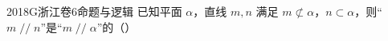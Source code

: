 
\begin{problem}{2018}{G}{浙江卷}{6}{命题与逻辑}
已知平面 $ \alpha $，直线 $ m,n $ 满足 $ m\not\subset\alpha $，$ n\subset\alpha $，则“$ m\mathop{//}n $”是“$ m\mathop{//}\alpha $”的（\hspace{1cm}）
\begin{choices}
\end{choices}
\end{problem}

\begin{answer}

\end{answer}

\begin{solutions}

\end{solutions}